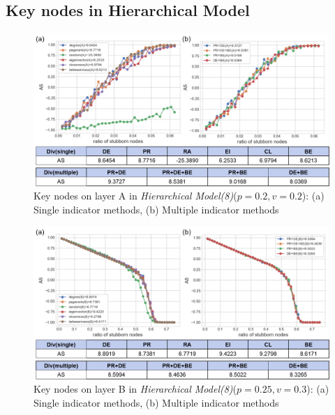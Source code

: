 \subsection{Key nodes in Hierarchical Model}
\begin{figure}[!htb]
	\centering
	\includegraphics[width=\hsize]{figure/chap5_keynode_HM_A.png}
	\caption{Key nodes on layer A in \textit{Hierarchical Model(8)}($p=0.2, v=0.2$):
		(a) Single indicator methods, (b) Multiple indicator methods}
	\label{chap5_keynode_HM_A}
\end{figure}
\begin{figure}[!htb]
	\centering
	\includegraphics[width=\hsize]{figure/chap5_keynode_HM_B.png}
	\caption{Key nodes on layer B in \textit{Hierarchical Model(8)}($p=0.25, v=0.3$):
		(a) Single indicator methods, (b) Multiple indicator methods}
	\label{chap5_keynode_HM_B}
\end{figure}

